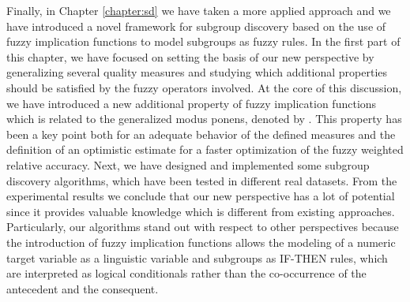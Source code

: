 Finally, in Chapter \ref{chapter:sd} we have taken a more applied approach and we have introduced a novel framework for subgroup discovery based on the use of fuzzy implication functions to model subgroups as fuzzy rules. In the first part of this chapter, we have focused on setting the basis of our new perspective by generalizing several quality measures and studying which additional properties should be satisfied by the fuzzy operators involved. At the core of this discussion, we have introduced a new additional property of fuzzy implication functions which is related to the generalized modus ponens, denoted by \MTC. This property has been a key point both for an adequate behavior of the defined measures and the definition of an optimistic estimate for a faster optimization of the fuzzy weighted relative accuracy. Next, we have designed and implemented some subgroup discovery algorithms, which have been tested in different real datasets. From the experimental results we conclude that our new perspective has a lot of potential since it provides valuable knowledge which is different from existing approaches. Particularly, our algorithms stand out with respect to other perspectives because the introduction of fuzzy implication functions allows the modeling of a numeric target variable as a linguistic variable and subgroups as IF-THEN rules, which are interpreted as logical conditionals rather than the co-occurrence of the antecedent and the consequent.

